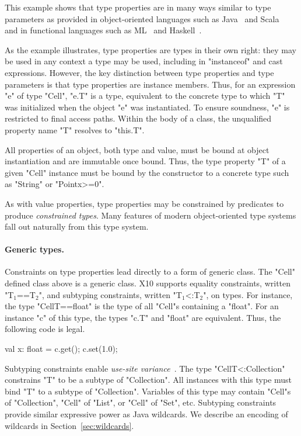 This example shows that type properties are in many ways similar to
type parameters as provided in object-oriented languages such as
Java~\cite{Java3} and Scala~\cite{scala} and in functional
languages such as ML~\cite{ml} and
Haskell~\cite{haskell}.

As the example illustrates,
type properties are types in their own right:
they may be used in any context a type may be used,
including in \xcd"instanceof" and cast expressions.
%
However, the key distinction between type properties
and type parameters is that type properties are instance
members.
Thus, for an expression \xcd"e" of type \xcd"Cell", \xcd"e.T" is
a type, equivalent to the concrete type to which \xcd"T" was
initialized when the object \xcd"e" was instantiated.
To ensure
soundness, \xcd"e" is restricted to final access paths.
Within the body of a class, the unqualified property name \xcd"T" resolves
to \xcd"this.T".

All properties of an object, both type and value, must be bound at object
instantiation and are immutable once bound.  Thus, the type
property \xcd"T" of a given \xcd"Cell" instance must be bound
by the constructor
to a concrete type such as \xcd"String" or \xcd"Point{x>=0}".

As with value properties, type properties may be constrained
by predicates to produce \emph{constrained types}.
Many features of modern object-oriented type systems fall out
naturally from this type system.

\paragraph{Generic types.}
Constraints on type properties lead directly to a form of generic class.
The \xcd"Cell" defined class above is a generic class.
X10 supports
equality constraints, written \xcdmath"T$_1$==T$_2$", and
subtyping constraints, written \xcdmath"T$_1$<:T$_2$", on types.
For instance,
the type \xcd"Cell{T==float}" is the type of all \xcd"Cell"s
containing a \xcd"float".  For an instance \xcd"c" of this type,
the types \xcd"c.T" and \xcd"float" are equivalent.  Thus, the
following code is legal.
\begin{xten}
val x: float = c.get();
c.set(1.0);
\end{xten}

Subtyping constraints enable \emph{use-site variance}~\cite{variance}.
The type \xcd"Cell{T<:Collection}"
constrains \xcd"T" to be a subtype of \xcd"Collection".
All instances with this type must bind \xcd"T" to a subtype of
\xcd"Collection".
Variables of this type may contain \xcd"Cell"s of
\xcd"Collection", \xcd"Cell" of \xcd"List",
or \xcd"Cell" of \xcd"Set", etc.
Subtyping constraints provide similar expressive power as Java
wildcards.  We describe an encoding of wildcards in
Section~\ref{sec:wildcards}. 

